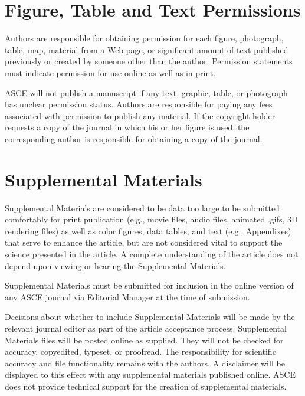 \documentclass[
  NewProceedings,
  letterpaper]{./assets/ascelike-new}
\begin{document}
\hypertarget{figure-table-and-text-permissions}{%
\section{Figure, Table and Text
Permissions}\label{figure-table-and-text-permissions}}

Authors are responsible for obtaining permission for each figure,
photograph, table, map, material from a Web page, or significant amount
of text published previously or created by someone other than the
author. Permission statements must indicate permission for use online as
well as in print.

ASCE will not publish a manuscript if any text, graphic, table, or
photograph has unclear permission status. Authors are responsible for
paying any fees associated with permission to publish any material. If
the copyright holder requests a copy of the journal in which his or her
figure is used, the corresponding author is responsible for obtaining a
copy of the journal.

\hypertarget{supplemental-materials}{%
\section{Supplemental Materials}\label{supplemental-materials}}

Supplemental Materials are considered to be data too large to be
submitted comfortably for print publication (e.g., movie files, audio
files, animated .gifs, 3D rendering files) as well as color figures,
data tables, and text (e.g., Appendixes) that serve to enhance the
article, but are not considered vital to support the science presented
in the article. A complete understanding of the article does not depend
upon viewing or hearing the Supplemental Materials.

Supplemental Materials must be submitted for inclusion in the online
version of any ASCE journal via Editorial Manager at the time of
submission.

Decisions about whether to include Supplemental Materials will be made
by the relevant journal editor as part of the article acceptance
process. Supplemental Materials files will be posted online as supplied.
They will not be checked for accuracy, copyedited, typeset, or
proofread. The responsibility for scientific accuracy and file
functionality remains with the authors. A disclaimer will be displayed
to this effect with any supplemental materials published online. ASCE
does not provide technical support for the creation of supplemental
materials.
\end{document}
